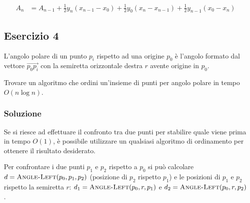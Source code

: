 \begin{align*}
	A_n &= A_{n-1} + \frac{1}{2}y_{n}(x_{n-1} - x_{0}) + \frac{1}{2}y_{0}(x_{n} - x_{n-1})+ \frac{1}{2}y_{n-1}(x_{0} - x_{n})
\end{align*}


\subsection{Esercizio 4}\label{esercizio-4}

L'angolo polare di un punto $p_i$ rispetto ad una origine $p_0$ è l'angolo formato dal vettore $\overrightarrow{p_0p_i}$ con la semiretta orizzontale destra $r$ avente origine in $p_0$.

Trovare un algoritmo che ordini un'insieme di punti per angolo polare in tempo $O(n \log n)$.

\subsubsection{Soluzione}

Se si riesce ad effettuare il confronto tra due punti per stabilire quale viene prima in tempo $O(1)$, è possibile utilizzare un qualsiasi algoritmo di ordinamento per ottenere il risultato desiderato.

Per confrontare i due punti $p_1$ e $p_2$ rispetto a $p_0$ si può calcolare $d = \textsc{Angle-Left}(p_0,p_1,p_2)$ (posizione di $p_2$ rispetto $p_1$) e le posizioni di $p_1$ e $p_2$ rispetto la semiretta $r$: $d_1 =  \textsc{Angle-Left}(p_0,r,p_1)$ e $d_2 =  \textsc{Angle-Left}(p_0,r,p_2)$.

